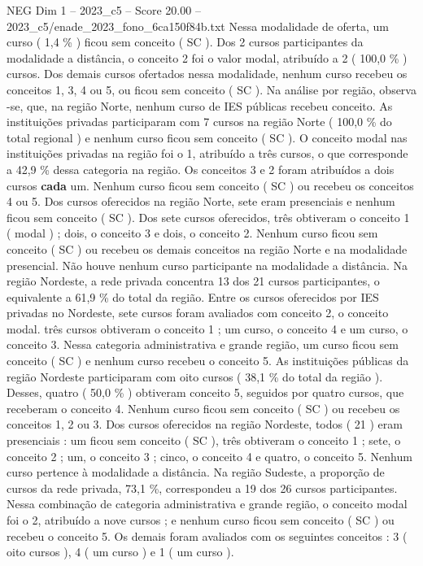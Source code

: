\begin{textsample}{NEG Dim 1 – 2023\_c5 – Score 20.00 – 2023\_c5/enade\_2023\_fono\_6ca150f84b.txt}
Nessa modalidade de oferta, um curso ( 1,4 \% ) ficou sem conceito ( SC ).
Dos 2 cursos participantes da modalidade a distância, o conceito 2 foi o valor modal, atribuído a 2 ( 100,0 \% ) cursos.
Dos demais cursos ofertados nessa modalidade, nenhum curso recebeu os conceitos 1, 3, 4 ou 5, ou ficou sem conceito ( SC ).
Na análise por região, observa -se, que, na região Norte, nenhum curso de IES públicas recebeu conceito.
As instituições privadas participaram com 7 cursos na região Norte ( 100,0 \% do total regional ) e nenhum curso ficou sem conceito ( SC ).
O conceito modal nas instituições privadas na região foi o 1, atribuído a três cursos, o que corresponde a 42,9 \% dessa categoria na região.
Os conceitos 3 e 2 foram atribuídos a dois cursos \textbf{cada} um.
Nenhum curso ficou sem conceito ( SC ) ou recebeu os conceitos 4 ou 5.
Dos cursos oferecidos na região Norte, sete eram presenciais e nenhum ficou sem conceito ( SC ).
Dos sete cursos oferecidos, três obtiveram o conceito 1 ( modal ) ; dois, o conceito 3 e dois, o conceito 2.
Nenhum curso ficou sem conceito ( SC ) ou recebeu os demais conceitos na região Norte e na modalidade presencial.
Não houve nenhum curso participante na modalidade a distância.
Na região Nordeste, a rede privada concentra 13 dos 21 cursos participantes, o equivalente a 61,9 \% do total da região.
Entre os cursos oferecidos por IES privadas no Nordeste, sete cursos foram avaliados com conceito 2, o conceito modal. três cursos obtiveram o conceito 1 ; um curso, o conceito 4 e um curso, o conceito 3.
Nessa categoria administrativa e grande região, um curso ficou sem conceito ( SC ) e nenhum curso recebeu o conceito 5.
As instituições públicas da região Nordeste participaram com oito cursos ( 38,1 \% do total da região ).
Desses, quatro ( 50,0 \% ) obtiveram conceito 5, seguidos por quatro cursos, que receberam o conceito 4.
Nenhum curso ficou sem conceito ( SC ) ou recebeu os conceitos 1, 2 ou 3.
Dos cursos oferecidos na região Nordeste, todos ( 21 ) eram presenciais : um ficou sem conceito ( SC ), três obtiveram o conceito 1 ; sete, o conceito 2 ; um, o conceito 3 ; cinco, o conceito 4 e quatro, o conceito 5.
Nenhum curso pertence à modalidade a distância.
Na região Sudeste, a proporção de cursos da rede privada, 73,1 \%, correspondeu a 19 dos 26 cursos participantes.
Nessa combinação de categoria administrativa e grande região, o conceito modal foi o 2, atribuído a nove cursos ; e nenhum curso ficou sem conceito ( SC ) ou recebeu o conceito 5.
Os demais foram avaliados com os seguintes conceitos : 3 ( oito cursos ), 4 ( um curso ) e 1 ( um curso ).

\end{textsample}
